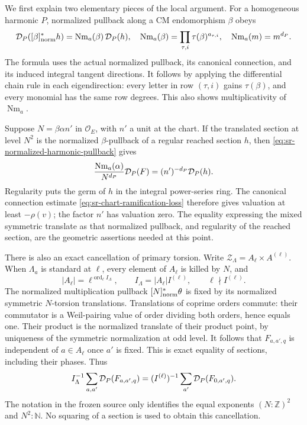 We first explain two elementary pieces of the local argument.
For a homogeneous harmonic \(P\), normalized pullback along a CM
endomorphism \(\beta\) obeys
\begin{equation}\label{eq:sr-normalized-harmonic-pullback}
 {\cal D}_P([\beta]^*_{\rm norm}h)
        =\operatorname{Nm}_a(\beta)\,{\cal D}_P(h),
 \quad
 \operatorname{Nm}_a(\beta)
   =\prod_{\tau,i}\tau(\beta)^{a_{\tau,i}},
 \quad
 \operatorname{Nm}_a(m)=m^{d_P}.
\end{equation}
The formula uses the actual normalized pullback, its canonical
connection, and its induced integral tangent directions.
It follows by applying the differential chain rule in each
eigendirection: every letter in row \((\tau,i)\) gains
\(\tau(\beta)\), and every monomial has the same row degrees.
This also shows multiplicativity of \(\operatorname{Nm}_a\).

Suppose \(N=\beta\alpha n'\) in \(\mathcal O_E\), with \(n'\)
a unit at the chart.  If the translated section at level \(N^2\)
is the normalized \(\beta\)-pullback of a regular reached section
\(h\), then \eqref{eq:sr-normalized-harmonic-pullback} gives
\[
 \frac{\operatorname{Nm}_a(\alpha)}{N^{d_P}}
             {\cal D}_P(F)
     =(n')^{-d_P}{\cal D}_P(h).
\]
Regularity puts the germ of \(h\) in the integral power-series
ring.  The canonical connection estimate
\eqref{eq:sr-chart-ramification-loss} therefore gives valuation
at least \(-\rho(v)\); the factor \(n'\) has valuation zero.
The equality expressing the mixed symmetric translate as that
normalized pullback, and regularity of the reached section,
are the geometric assertions needed at this point.

There is also an exact cancellation of primary torsion.
Write \(\mathcal Z_\Lambda=A_\ell\times A^{(\ell)}\).
When \(\Lambda_a\) is standard at \(\ell\), every element of
\(A_\ell\) is killed by \(N\), and
\[
 |A_\ell|=\ell^{\operatorname{ord}_\ell I_\Lambda},
 \qquad I_\Lambda=|A_\ell|I^{(\ell)},\qquad
 \ell\nmid I^{(\ell)}.
\]
The normalized multiplication pullback \([N]^*_{\rm norm}\theta\)
is fixed by its normalized symmetric \(N\)-torsion translations.
Translations of coprime orders commute: their commutator is a
Weil-pairing value of order dividing both orders, hence equals
one.  Their product is the normalized translate of their product
point, by uniqueness of the symmetric normalization at odd level.
It follows that \(F_{a,a',q}\) is independent of \(a\in A_\ell\)
once \(a'\) is fixed.
This is exact equality of sections, including their phases.
Thus
\begin{equation}\label{eq:sr-primary-index-cancellation}
 I_\Lambda^{-1}\sum_{a,a'}{\cal D}_P(F_{a,a',q})
       =(I^{(\ell)})^{-1}\sum_{a'}{\cal D}_P(F_{0,a',q}).
\end{equation}
The notation  in the frozen source only identifies
the equal exponents \((N:\mathbb Z)^2\) and \(N^2:\mathbb N\).
No squaring of a section is used to obtain this cancellation.

